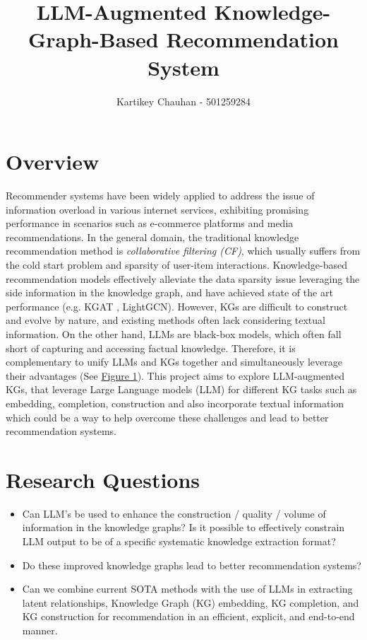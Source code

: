 \documentclass[a4paper]{article}
\title{LLM-Augmented Knowledge-Graph-Based Recommendation System
}
\author{Kartikey Chauhan - 501259284}
\date{}
\begin{document}
\maketitle
\section*{Overview}
Recommender systems have been widely applied to address the issue of information overload in various internet services, exhibiting promising performance in scenarios such as e-commerce platforms and media recommendations. 
In the general domain, the traditional knowledge recommendation method is  \textit{collaborative filtering (CF)}, which usually suffers from the cold start problem and sparsity of user-item interactions. 
Knowledge-based recommendation models effectively alleviate the data sparsity issue leveraging the side information in the knowledge graph, and have achieved state of the art performance\cite{guo2020survey} (e.g. KGAT\cite{wang2019kgat} , LightGCN\cite{he2020lightgcn}).
However, KGs are difficult to construct and evolve by nature, and existing methods often lack considering textual information. On the other hand, LLMs are black-box models, which often fall short of capturing and accessing factual knowledge.
Therefore, it is complementary to unify LLMs and KGs together and simultaneously leverage their advantages (See \hyperref[fig:llm_vs_kg]{Figure 1}).
This project aims to explore LLM-augmented KGs, that leverage Large Language models (LLM) for different KG tasks such as embedding, completion, construction and also incorporate textual information which could be a way to help overcome these challenges and lead to better recommendation systems.

\section*{Research Questions}

\begin{itemize}
\item Can LLM's be used to enhance the construction / quality / volume of information in the knowledge graphs? Is it possible to effectively constrain LLM output to be of a specific systematic knowledge extraction format?
\item Do these improved knowledge graphs lead to better recommendation systems? 
\item Can we combine current SOTA methods with the use of LLMs in extracting latent relationships, Knowledge Graph (KG) embedding, KG completion, and KG construction for recommendation in an efficient, explicit, and end-to-end manner.
\end{itemize}
\end{document}
